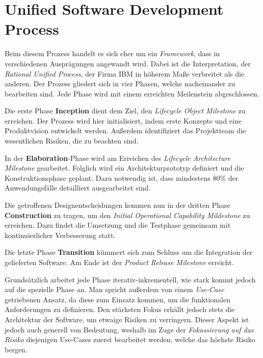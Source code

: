 \section{Unified Software Development Process}

Beim diesem Prozess handelt es sich eher um ein \textit{Framework}, dass in verschiedenen Ausprägungen angewandt wird. Dabei ist die Interpretation, der \textit{Rational Unified Process}, der Firma IBM in höherem Maße verbreitet als die anderen. Der Prozess gliedert sich in vier Phasen, welche nacheinander zu bearbeiten sind. Jede Phase wird mit einem erreichten Meilenstein abgeschlossen. 

Die erste Phase \textbf{Inception} dient dem Ziel, den \textit{Lifecycle Object Milestone} zu erreichen. Der Prozess wird hier initialisiert, indem erste Konzepte und eine Produktvision entwickelt werden. Außerdem identifiziert das Projektteam die wesentlichen Risiken, die zu beachten sind.

In der \textbf{Elaboration}-Phase wird am Erreichen des \textit{Lifecycle Architecture Milestone} gearbeitet. Folglich wird ein Architekturprototyp definiert und die Konstruktionsphase geplant. Dazu notwendig ist, dass mindestens 80\% der Anwendungsfälle detailliert ausgearbeitet sind.

Die getroffenen Designentscheidungen kommen nun in der dritten Phase \textbf{Construction} zu tragen, um den \textit{Initial Operational Capability Mildestone} zu erreichen. Dazu findet die Umsetzung und die Testphase gemeinsam mit kontinuierlicher Verbesserung statt.

Die letzte Phase \textbf{Transition} kümmert sich zum Schluss um die Integration der gelieferten Software. Am Ende ist der \textit{Product Release Milestone} erreicht.

Grundsätzlich arbeitet jede Phase iterativ-inkrementell, wie stark kommt jedoch auf die spezielle Phase an. Man spricht außerdem von einem \textit{Use-Case} getriebenen Ansatz, da diese zum Einsatz kommen, um die funktionalen Anforderungen zu definieren. Den stärksten Fokus erhällt jedoch stets die Architektur der Software, um etwaige Risiken zu verringern. Dieser Aspekt ist jedoch auch generell von Bedeutung, weshalb im Zuge der \textit{Fokussierung auf das Risiko} diejenigen Use-Cases zuerst bearbeitet werden, welche das höchste Risiko bergen.